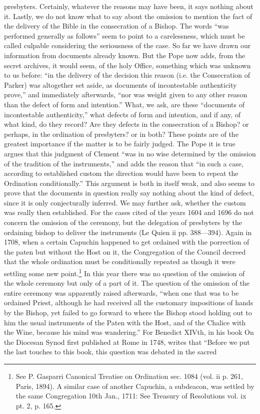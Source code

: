 presbyters. Certainly, whatever the reasons may have been, it says nothing about it. Lastly, we do not know what to say about the omission to mention the fact of the delivery of the Bible in the consecration of a Bishop. The words “was performed generally as follows” seem to point to a carelessness, which must be called culpable considering the seriousness of the case. So far we have drawn our information from documents already known. But the Pope now adds, from the secret archives, it would seem, of the holy Office, something which was unknown to us before: “in the delivery of the decision this reason (i.e. the Consecration of Parker) was altogether set aside, as documents of incontestable authenticity prove,” and immediately afterwards, “nor was weight given to any other reason than the defect of form and intention.” What, we ask, are these “documents of incontestable authenticity,” what defects of form and intention, and if any, of what kind, do they record? Are they defects in the consecration of a Bishop? or perhaps, in the ordination of presbyters? or in both? These points are of the greatest importance if the matter is to be fairly judged. The Pope it is true argues that this judgment of Clement “was in no wise determined by the omission of the tradition of the instruments,” and adds the reason that “in such a case, according to established custom the direction would have been to repeat the Ordination conditionally.” This argument is both in itself weak, and also seems to prove that the documents in question really say nothing about the kind of defect, since it is only conjecturally inferred. We may further ask, whether the custom was really then established. For the cases cited of the years 1604 and 1696 do not concern the omission of the ceremony, but the delegation of presbyters by the ordaining bishop to deliver the instruments (Le Quien ii pp. 388—394). Again in 1708, when a certain Capuchin happened to get ordained with the porrection of the paten but without the Host on it, the Congregation of the Council decreed that the whole ordination must be conditionally repeated as though it were settling some new point.\footnote{See P. Gasparri Canonical Treatise on Ordination sec. 1084 (vol. ii p. 261, Paris, 1894). A similar case of another Capuchin, a subdeacon, was settled by the same Congregation 10th Jan., 1711: See Treasury of Resolutions vol. ix pt. 2, p. 165.} In this year there was no question of the omission of the whole ceremony but only of a part of it. The question of the omission of the entire ceremony was apparently raised afterwards, “when one that was to be ordained Priest, although he had received all the customary impositions of hands by the Bishop, yet failed to go forward to where the Bishop stood holding out to him the usual instruments of the Paten with the Host, and of the Chalice with the Wine, because his mind was wandering.” For Benedict XIVth, in his book On the Diocesan Synod first published at Rome in 1748, writes that “Before we put the last touches to this book, this question was debated in the sacred

